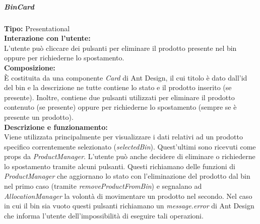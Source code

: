 \subparagraph{\colorbox{verde_uml}{BinCard}}
\textbf{Tipo:} Presentational \\
\textbf{Interazione con l'utente:} \\
L'utente può cliccare dei pulsanti per eliminare il prodotto presente nel bin oppure per richiederne lo spostamento.\\
\textbf{Composizione:} \\
È costituita da una componente \textit{Card} di Ant Design, il cui titolo è dato dall'id del bin e la descrizione ne tutte contiene lo stato e il prodotto inserito (se presente). Inoltre, contiene due pulsanti utilizzati per eliminare il prodotto contenuto (se presente) oppure per richiederne lo spostamento (sempre se è presente un prodotto).\\
\textbf{Descrizione e funzionamento:} \\
Viene utilizzata principalmente per visualizzare i dati relativi ad un prodotto specifico correntemente selezionato (\textit{selectedBin}). Quest'ultimi sono ricevuti come props da \textit{ProductManager}. L'utente può anche decidere di eliminare o richiederne lo spostamento tramite alcuni pulsanti. Questi richiamano delle funzioni di \textit{ProductManager} che aggiornano lo stato con l'eliminazione del prodotto dal bin nel primo caso (tramite \textit{removeProductFromBin}) e segnalano ad \textit{AllocationManager} la volontà di movimentare un prodotto nel secondo. Nel caso in cui il bin sia vuoto questi pulsanti richiamano un \textit{message.error} di Ant Design che informa l'utente dell'impossibilità di eseguire tali operazioni.

